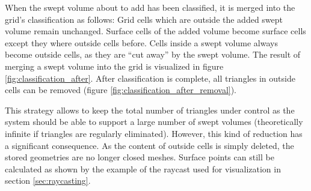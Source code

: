 When the swept volume about to add has been classified, it is merged into the grid's classification as follows:
Grid cells which are outside the added swept volume remain unchanged.
Surface cells of the added volume become surface cells except they where outside cells before.
Cells inside a swept volume always become outside cells, as they are \enquote{cut away} by the swept volume.
The result of merging a swept volume into the grid is visualized in figure \ref{fig:classification_after}.
After classification is complete, all triangles in outside cells can be removed (\cf figure \ref{fig:classification_after_removal}).

This strategy allows to keep the total number of triangles under control as the system should be able to support a large number of swept volumes (theoretically infinite if triangles are regularly eliminated).
%
However, this kind of reduction has a significant consequence.
As the content of outside cells is simply deleted, the stored geometries are no longer closed meshes.
Surface points can still be calculated as shown by the example of the raycast used for visualization in section \ref{sec:raycasting}.

